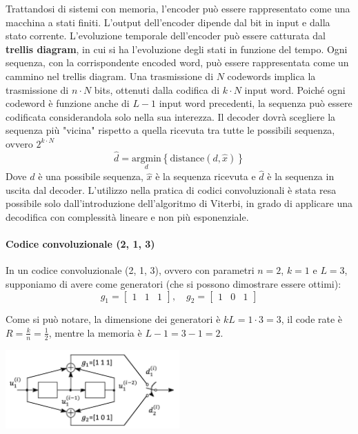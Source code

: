 Trattandosi di sistemi con memoria, l'encoder può essere rappresentato come una macchina a stati finiti.
L'output dell'encoder dipende dal bit in input e dalla stato corrente.
L'evoluzione temporale dell'encoder può essere catturata dal \textbf{trellis diagram}, in cui si ha l'evoluzione degli stati in funzione del tempo.
Ogni sequenza, con la corrispondente encoded word, può essere rappresentata come un cammino nel trellis diagram.
Una trasmissione di $N$ codewords implica la trasmissione di $n \cdot N$ bits, ottenuti dalla codifica di $k \cdot N$ input word.
Poiché ogni codeword è funzione anche di $L-1$ input word precedenti, la sequenza può essere codificata considerandola solo nella sua interezza. 
Il decoder dovrà scegliere la sequenza più "vicina" rispetto a quella ricevuta tra tutte le possibili sequenza, ovvero $2^{k \cdot N}$
\[
    \hat{d} = \underset{d}{\text{argmin}} \left\{\text{distance}(d, \hat{x})\right\}
\]
Dove $d$ è una possibile sequenza, $\hat{x}$ è la sequenza ricevuta e $\hat{d}$ è la sequenza in uscita dal decoder.
L'utilizzo nella pratica di codici convoluzionali è stata resa possibile solo dall'introduzione dell'algoritmo di Viterbi, in grado di applicare una decodifica con complessità lineare e non più esponenziale.

\paragraph*{Codice convoluzionale (2, 1, 3)}

In un codice convoluzionale (2, 1, 3), ovvero con parametri $n=2$, $k=1$ e $L=3$, supponiamo di avere come generatori (che si possono dimostrare essere ottimi):
\[
    g_1 = \begin{bmatrix}1 & 1 & 1\end{bmatrix}, \quad g_2 = \begin{bmatrix}1 & 0 & 1\end{bmatrix}
\]

Come si può notare, la dimensione dei generatori è $kL = 1 \cdot 3 = 3$, il code rate è $R = \frac{k}{n} = \frac{1}{2}$, mentre la memoria è $L - 1 = 3 - 1 = 2$.
\begin{center}
    \includegraphics[width=0.5\textwidth]{imgs/213code.png}
\end{center}

